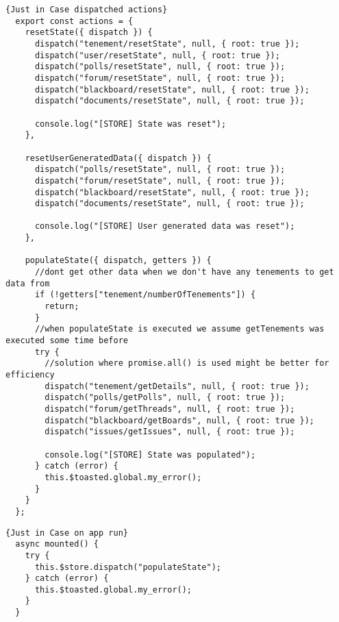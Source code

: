 \begin{lstlisting}[caption=Just in Case dispatched actions, captionpos=b, style=htmlcssjs, label=jicdispa]{Just in Case dispatched actions}
  export const actions = {
    resetState({ dispatch }) {
      dispatch("tenement/resetState", null, { root: true });
      dispatch("user/resetState", null, { root: true });
      dispatch("polls/resetState", null, { root: true });
      dispatch("forum/resetState", null, { root: true });
      dispatch("blackboard/resetState", null, { root: true });
      dispatch("documents/resetState", null, { root: true });
  
      console.log("[STORE] State was reset");
    },
  
    resetUserGeneratedData({ dispatch }) {
      dispatch("polls/resetState", null, { root: true });
      dispatch("forum/resetState", null, { root: true });
      dispatch("blackboard/resetState", null, { root: true });
      dispatch("documents/resetState", null, { root: true });
  
      console.log("[STORE] User generated data was reset");
    },
  
    populateState({ dispatch, getters }) {
      //dont get other data when we don't have any tenements to get data from
      if (!getters["tenement/numberOfTenements"]) {
        return;
      }
      //when populateState is executed we assume getTenements was executed some time before
      try {
        //solution where promise.all() is used might be better for efficiency
        dispatch("tenement/getDetails", null, { root: true });
        dispatch("polls/getPolls", null, { root: true });
        dispatch("forum/getThreads", null, { root: true });
        dispatch("blackboard/getBoards", null, { root: true });
        dispatch("issues/getIssues", null, { root: true });
  
        console.log("[STORE] State was populated");
      } catch (error) {
        this.$toasted.global.my_error();
      }
    }
  };
\end{lstlisting}

\begin{lstlisting}[caption=Just in Case Store Population on app run, captionpos=b, style=htmlcssjs, label=jic]{Just in Case on app run}
  async mounted() {
    try {
      this.$store.dispatch("populateState");
    } catch (error) {
      this.$toasted.global.my_error();
    }
  }
\end{lstlisting}

\newpage

